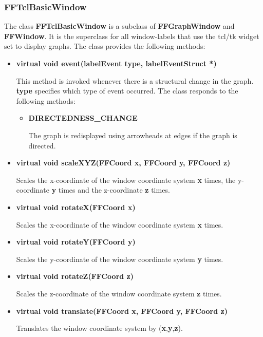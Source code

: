 \subsubsection{FFTclBasicWindow}

The class {\bf FFTclBasicWindow} is a subclass of {\bf FFGraphWindow}
and {\bf FFWindow}. It is the superclass for all window-labels that
use the tcl/tk widget set to display graphs. The class provides the
following methods:

\begin{itemize}

\item{\bf virtual void event(labelEvent type, labelEventStruct *)}

This method is invoked whenever there is a structural change in the
graph.  {\bf type} specifies which type of event occurred. The class
responds to the following methods:

\begin{itemize}

\item{\bf DIRECTEDNESS\_CHANGE}

The graph is redisplayed using arrowheads at edges if the graph is
directed.

\end{itemize}

\item{\bf virtual void scaleXYZ(FFCoord x, FFCoord y, FFCoord z)}

Scales the x-coordinate of the window coordinate system {\bf x} times,
the y-coordinate {\bf y} times and the z-coordinate {\bf z} times. 

\item{\bf virtual void rotateX(FFCoord x)}

Scales the x-coordinate of the window coordinate system {\bf x} times.

\item{\bf virtual void rotateY(FFCoord y)}

Scales the y-coordinate of the window coordinate system {\bf y} times.

\item{\bf virtual void rotateZ(FFCoord z)}

Scales the z-coordinate of the window coordinate system {\bf z} times.

\item{\bf virtual void translate(FFCoord x, FFCoord y, FFCoord z)}

Translates the window coordinate system by ({\bf x},{\bf y},{\bf z}).
        

\end{itemize}

